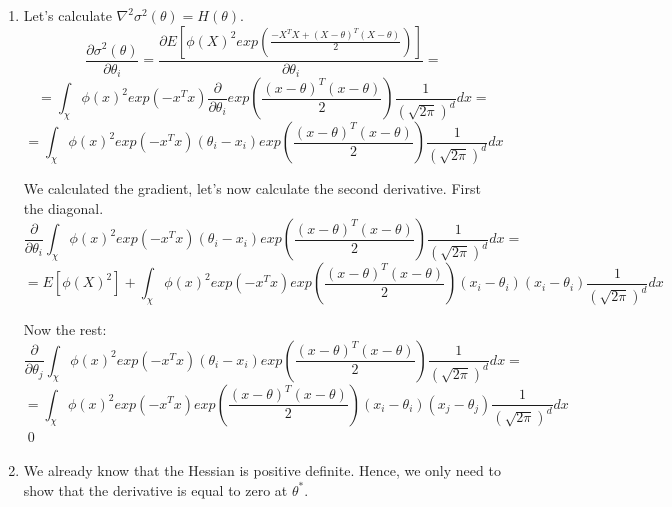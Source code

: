 \documentclass[12pt,letterpaper]{article}
\begin{document}
\begin{enumerate}[leftmargin=!,labelindent=5pt]
	Make $X + \theta = Y$, then:

	$$
	\int_{\mathbb{R}^d} \phi(y)^2 exp\left(
	 - \theta^T
	\theta - 2\theta^T (y-\theta) \right)exp(-(y-\theta)^T (y-\theta) / 2)
	\frac{1}{(\sqrt{2\pi})^d}
	dy_1...dy_d = $$

	$$ = 
	\int_{\mathbb{R}^d} \phi(y)^2 exp\left(
	\frac{1}{2}(y-\theta)^T(y-\theta) - \frac{y^Ty}{2}
	\right)
	exp \left( \frac{-y^Ty}{2}
	\right)
	\frac{1}{(\sqrt{2\pi})^d}
	dy_1...dy_d = $$
	$$ 
	= E\left[ 
	\phi^2(X) exp\left(
		\frac{-1}{2}X^T X + \frac{1}{2}(X - \theta)^T(X - \theta)
		\right)
	\right]
	$$

	Therefore, 
	$$ \sigma^2(\theta) = E\left[ 
	\phi^2(X) exp\left(
		\frac{-1}{2}X^T X + \frac{1}{2}(X - \theta)^T(X - \theta)
		\right)
	\right] - (E[\phi(X)]^2 $$ \qed



	\item Let's calculate $\nabla ^2\sigma^2(\theta) = H(\theta)$.
	$$
	\frac{\partial \sigma^2(\theta)}{\partial \theta_i} =
	\frac{\partial E[\phi(X)^2exp(\frac{-X^T X+(X-\theta)^T(X-\theta)}{2} )]}
	{\partial \theta_i} =
	$$
	$$
	= \int_\chi \phi(x)^2 exp(-x^Tx)
	\frac{\partial}{\partial \theta_i}
	exp \left(\frac{(x-\theta)^T(x-\theta)}{2}\right)
	\frac{1}{(\sqrt{2\pi})^d}
	dx = 
	$$
	$$
	= \int_\chi \phi(x)^2 exp(-x^Tx)
	(\theta_i - x_i)
	exp \left(\frac{(x-\theta)^T(x-\theta)}{2}\right)
	\frac{1}{(\sqrt{2\pi})^d}
	dx
	$$

	We calculated the gradient, let's now calculate the second derivative.
	First the diagonal.
	$$
	\frac{\partial}{\partial \theta_i}\int_\chi \phi(x)^2 exp(-x^Tx)
	(\theta_i - x_i)
	exp \left(\frac{(x-\theta)^T(x-\theta)}{2}\right)
	\frac{1}{(\sqrt{2\pi})^d}
	dx =
	$$
	$$
	 = E[\phi(X)^2] + \int_\chi \phi(x)^2 exp(-x^T x)
	exp\left(\frac{(x - \theta)^T(x - \theta)}{2}\right)
	(x_i-\theta_i)(x_i - \theta_i)
	\frac{1}{(\sqrt{2\pi})^d}dx
	$$

	Now the rest:
	$$
	\frac{\partial}{\partial \theta_j}\int_\chi \phi(x)^2 exp(-x^Tx)
	(\theta_i - x_i)
	exp \left(\frac{(x-\theta)^T(x-\theta)}{2}\right)
	\frac{1}{(\sqrt{2\pi})^d}
	dx =
	$$
	$$
	 = \int_\chi \phi(x)^2 exp(-x^T x)
	exp\left(\frac{(x - \theta)^T(x - \theta)}{2}\right)
	(x_i-\theta_i)(x_j - \theta_j)
	\frac{1}{(\sqrt{2\pi})^d}dx
	$$
	\qed

	\item We already know that the Hessian is positive definite. Hence,
	we only need to show that the derivative is equal to zero at
	$\theta^*$.


\end{enumerate}
\end{document}
